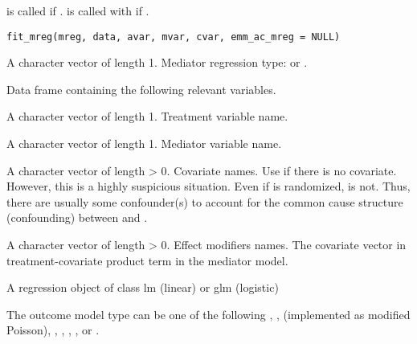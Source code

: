 \documentclass[a4paper]{book}
\begin{document}
%
\begin{Description}
 is called if .  is called with  if .
\end{Description}
%
\begin{Usage}
\begin{verbatim}
fit_mreg(mreg, data, avar, mvar, cvar, emm_ac_mreg = NULL)
\end{verbatim}
\end{Usage}
%
\begin{Arguments}
\begin{ldescription}
\item[\code{mreg}] A character vector of length 1. Mediator regression type:  or .

\item[\code{data}] Data frame containing the following relevant variables.

\item[\code{avar}] A character vector of length 1. Treatment variable name.

\item[\code{mvar}] A character vector of length 1. Mediator variable name.

\item[\code{cvar}] A character vector of length > 0. Covariate names. Use  if there is no covariate. However, this is a highly suspicious situation. Even if  is randomized,  is not. Thus, there are usually some confounder(s) to account for the common cause structure (confounding) between  and .

\item[\code{emm\_ac\_mreg}] A character vector of length > 0. Effect modifiers names. The covariate vector in treatment-covariate product term in the mediator model.
\end{ldescription}
\end{Arguments}
%
\begin{Value}
A regression object of class lm (linear) or glm (logistic)
\end{Value}
%
\begin{Description}
The outcome model type  can be one of the following , ,  (implemented as modified Poisson), , , , , or .
\end{Description}
\end{document}
